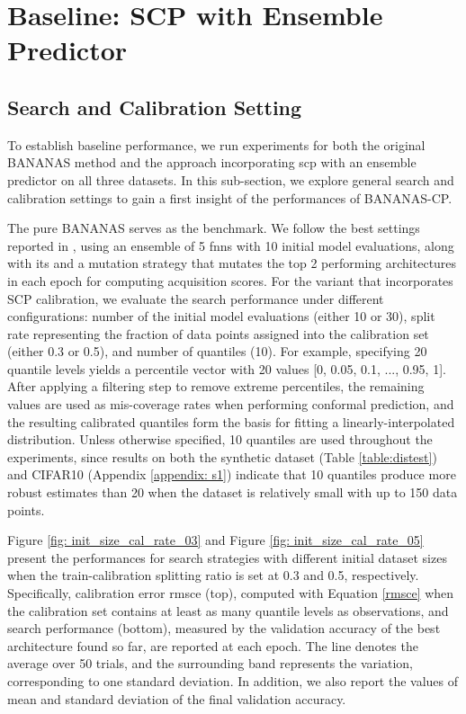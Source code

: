 \documentclass[a4paper,oneside,bibliography=totoc]{scrbook}
\begin{document}
\section{Baseline: SCP with Ensemble Predictor}
\label{sec: baseline}

\subsection{Search and Calibration Setting}
\label{sec: sc_setting}
To establish baseline performance, we run experiments for both the original BANANAS method and the approach incorporating \gls{scp} with an ensemble predictor on all three datasets. In this sub-section, we explore general search and calibration settings to gain a first insight of the performances of BANANAS-CP.

The pure BANANAS serves as the benchmark. We follow the best settings reported in \cite{white2019bananas}, using an ensemble of 5 \gls{fnns} with 10 initial model evaluations, along with \gls{its} and a mutation strategy that mutates the top 2 performing architectures in each epoch for computing acquisition scores. For the variant that incorporates SCP calibration, we evaluate the search performance under different configurations: number of the initial model evaluations (either 10 or 30), split rate representing the fraction of data points assigned into the calibration set (either 0.3 or 0.5), and number of quantiles (10). For example, specifying 20 quantile levels yields a percentile vector with 20 values [0, 0.05, 0.1, ..., 0.95, 1]. After applying a filtering step to remove extreme percentiles, the remaining values are used as mis-coverage rates when performing conformal prediction, and the resulting calibrated quantiles form the basis for fitting a linearly-interpolated distribution. Unless otherwise specified, 10 quantiles are used throughout the experiments, since results on both the synthetic dataset (Table \ref{table:distest}) and CIFAR10 (Appendix \ref{appendix: s1}) indicate that 10 quantiles produce more robust estimates than 20 when the dataset is relatively small with up to 150 data points.

Figure \ref{fig: init_size_cal_rate_03} and Figure \ref{fig: init_size_cal_rate_05} present the performances for search strategies with different initial dataset sizes when the train-calibration splitting ratio is set at 0.3 and 0.5, respectively. Specifically, calibration error \gls{rmsce} (top), computed with Equation \ref{rmsce} when the calibration set contains at least as many quantile levels as observations, and search performance (bottom), measured by the validation accuracy of the best architecture found so far, are reported at each epoch. The line denotes the average over 50 trials, and the surrounding band represents the variation, corresponding to one standard deviation. In addition, we also report the values of mean and standard deviation of the final validation accuracy.
\end{document}
